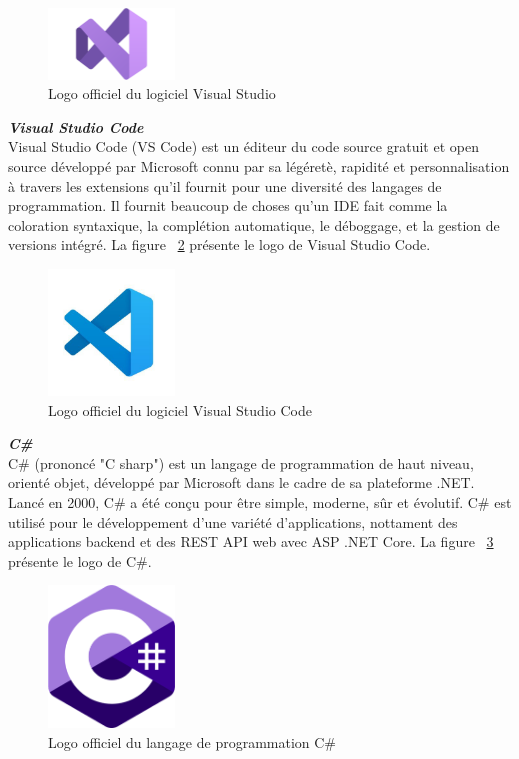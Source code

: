 \begin{figure}[H]
\centering
\includegraphics[width=0.3\textwidth]{logos/vs.png}
\caption{Logo officiel du logiciel Visual Studio}
\label{fig:vs}
\end{figure}

\noindent
{\small\textbf{\textit{Visual Studio Code}}}\mbox{}\\
Visual Studio Code (VS Code) est un éditeur du code source gratuit et open source développé par Microsoft connu par sa légéretè, rapidité et personnalisation à travers les extensions qu'il fournit pour une diversité des langages de programmation.
Il fournit beaucoup de choses qu'un IDE fait comme la coloration syntaxique, la complétion automatique, le déboggage, et la gestion de versions intégré. La figure ~\ref{fig:vsc} présente le logo de Visual Studio Code.
\begin{figure}[H]
\centering
\includegraphics[width=0.3\textwidth]{logos/vsc.png}
\caption{Logo officiel du logiciel Visual Studio Code}
\label{fig:vsc}
\end{figure}

\noindent
{\small\textbf{\textit{C\#}}}\mbox{}\\
C\# (prononcé "C sharp") est un langage de programmation de haut niveau, orienté objet, développé par Microsoft dans le cadre de sa plateforme .NET. Lancé en 2000, C\# a été conçu pour être simple, moderne, sûr et évolutif. C\# est utilisé pour le développement  d'une variété d'applications, nottament des applications backend et des REST API web avec ASP .NET Core. La figure ~\ref{fig:cs} présente le logo de C\#.
\begin{figure}[H]
\centering
\includegraphics[width=0.3\textwidth]{logos/csharp.png}
\caption{Logo officiel du langage de programmation C\#}
\label{fig:cs}
\end{figure}

